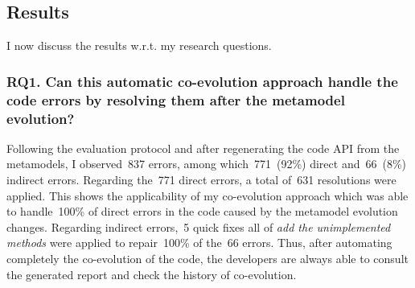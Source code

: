 \subsection{Results}
I now discuss the results w.r.t. my research questions.

\subsubsection{RQ1. Can this automatic co-evolution approach handle the code errors by resolving them after the metamodel evolution?}

Following the evaluation protocol and after regenerating the code API from the metamodels, I observed~837 errors, among which~771~(92\%) direct and~66~(8\%) indirect errors. 
%
Regarding the~771 direct errors, 
a total of~631 resolutions were applied.  
This shows the applicability of my co-evolution approach which was able to handle~100\% of direct errors in the code caused by the metamodel evolution changes. Regarding indirect errors,~5 quick fixes all of \emph{add the unimplemented methods}  were applied to repair~100\% of the~66 errors.
Thus, after automating completely the co-evolution of the code, the developers are always able to consult the generated report and check the history of co-evolution.

